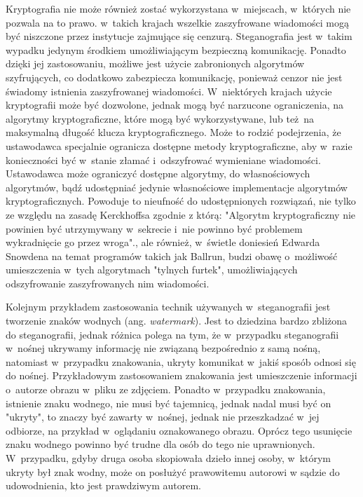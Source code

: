 \documentclass[a4paper, twoside, 12pt]{report}
\begin{document}
        Kryptografia nie może również zostać wykorzystana w~miejscach, w~których
        nie pozwala na to prawo.\cite{CRYPTOGRAFYLAW} w~takich krajach wszelkie
        zaszyfrowane wiadomości mogą być niszczone przez instytucje zajmujące się
        cenzurą. Steganografia jest w~takim
        wypadku jedynym środkiem umożliwiającym bezpieczną komunikację. Ponadto
        dzięki jej zastosowaniu, możliwe jest użycie zabronionych algorytmów szyfrujących,
        co dodatkowo zabezpiecza komunikację, ponieważ cenzor nie jest świadomy
        istnienia zaszyfrowanej wiadomości. W~niektórych krajach użycie kryptografii
        może być dozwolone, jednak mogą być narzucone ograniczenia, na algorytmy
        kryptograficzne, które mogą być wykorzystywane, lub też na maksymalną
        długość klucza kryptograficznego. Może to rodzić podejrzenia, że ustawodawca
        specjalnie ogranicza dostępne metody kryptograficzne, aby w~razie konieczności
        być w~stanie złamać i~odszyfrować wymieniane wiadomości. Ustawodawca
        może ograniczyć dostępne algorytmy, do własnościowych algorytmów, bądź
        udostępniać jedynie własnościowe implementacje algorytmów kryptograficznych.
        Powoduje to nieufność do udostępnionych rozwiązań, nie tylko ze względu
        na zasadę Kerckhoffsa zgodnie z którą:
        "Algorytm kryptograficzny nie powinien być utrzymywany w~sekrecie i~nie powinno
        być problemem wykradnięcie go przez wroga".\cite{KERCKHOS}, ale również,
        w~świetle doniesień Edwarda Snowdena na temat programów takich jak
        Ballrun\cite{WIKI:BALLRUN}, budzi obawę o~możliwość umieszczenia w~tych
        algorytmach "tylnych furtek", umożliwiających odszyfrowanie zaszyfrowanych
        nim wiadomości.

        Kolejnym przykładem zastosowania technik używanych w~steganografii jest
        tworzenie znaków wodnych (ang. \emph{watermark}). Jest to dziedzina bardzo zbliżona do steganografii,
        jednak różnica polega na tym, że w~przypadku steganografii w~nośnej ukrywamy
        informację nie związaną bezpośrednio z samą nośną, natomiast w~przypadku znakowania,
        ukryty komunikat w~jakiś sposób odnosi się do nośnej. Przykładowym zastosowaniem
        znakowania jest umieszczenie informacji o~autorze obrazu w~pliku ze zdjęciem.
        Ponadto w~przypadku znakowania, istnienie znaku wodnego, nie musi być tajemnicą,
        jednak nadal musi być on "ukryty", to znaczy być zawarty w~nośnej, jednak
        nie przeszkadzać w~jej odbiorze, na przykład w~oglądaniu oznakowanego obrazu.
        Oprócz tego usunięcie znaku wodnego powinno być trudne dla osób do tego nie
        uprawnionych. W~przypadku, gdyby druga osoba skopiowała dzieło innej osoby,
        w~którym ukryty był znak wodny, może on posłużyć prawowitemu autorowi w
        sądzie do udowodnienia, kto jest prawdziwym autorem.
\end{document}
